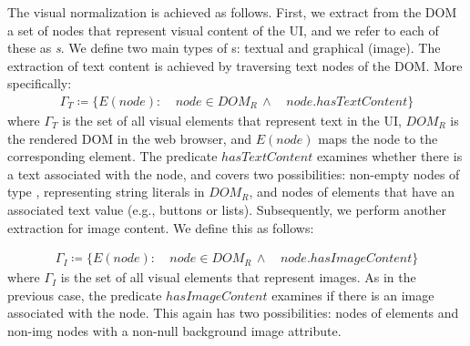 The visual normalization is achieved as follows.
First, we extract from the DOM a set of nodes that represent visual content of the UI, and we refer to each of these as \emph{{\VizElem}s}.
We define two main types of {\VizElem}s: textual and graphical (image).
The extraction of text content is achieved by traversing text nodes of the DOM. More specifically:
\begin{align}
\Gamma_{T} \coloneqq \{ E(node) : \ & node \in DOM_R \!\, 			\land \,  & node.hasTextContent \}
\end{align}
where $\Gamma_{T}$ is the set of all visual elements that represent text in the UI, $DOM_R$ is the rendered DOM in the web browser, and $E(node)$ maps the node to the corresponding element. 
The predicate $hasTextContent$ examines whether there is a text associated with the node, 
and covers two possibilities: non-empty nodes of type , representing string literals in $DOM_R$, 
and nodes of  elements that have an associated text value (e.g., buttons or lists).
Subsequently, we perform another extraction for image content. We define this as follows:

\begin{align}
\Gamma_{I} \coloneqq \{ E(node) : \ & node \in DOM_R \!\, 		\land \, & node.hasImageContent \}
\end{align}
where $\Gamma_{I}$ is the set of all visual elements that represent images. As in the previous case, the predicate $hasImageContent$ examines if there is an image associated with the node. This again has two possibilities: nodes of  elements and non-img nodes with a non-null background image attribute. 

